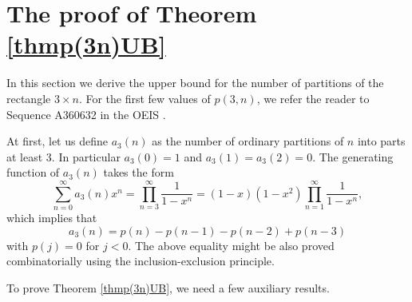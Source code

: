 \documentclass[12pt,a4paper]{amsart}
\numberwithin{equation}{section}
\theoremstyle{plain}
\theoremstyle{definition}
\theoremstyle{remark}
\begin{document}
\section{The proof of Theorem \ref{thmp(3n)UB}}




In this section we derive the upper bound for the number of partitions of the rectangle $3\times n$. For the first few values of $p(3,n)$, we refer the reader to Sequence A360632 in the OEIS \cite{OEISA360632}. 

At first, let us define $a_3(n)$ as the number of ordinary partitions of $n$ into parts at least $3$. In particular $a_3(0)=1$ and $a_3(1)=a_3(2)=0$. The generating function of $a_3(n)$ takes the form
\begin{equation}\label{eq:a3-generating-function}
\sum_{n=0}^\infty a_3(n)x^n
=
\prod_{n=3}^\infty\frac{1}{1-x^n}
=
(1-x)(1-x^2)\prod_{n=1}^\infty\frac{1}{1-x^n},
\end{equation}
which implies that
$$
a_3(n)=p(n)-p(n-1)-p(n-2)+p(n-3)
$$
with $p(j)=0$ for $j<0$. The above equality might be also proved combinatorially using the inclusion-exclusion principle.

To prove Theorem \ref{thmp(3n)UB}, we need a few auxiliary results.
\end{document}

